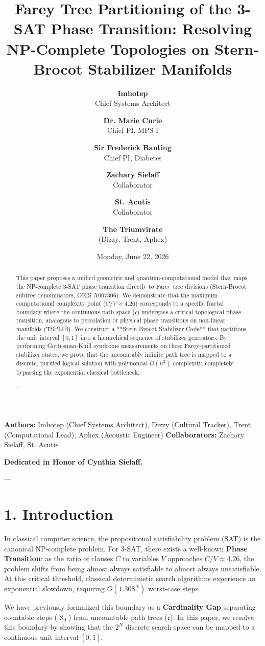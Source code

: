 \documentclass[11pt,twocolumn]{article}
\title{\textbf{Farey Tree Partitioning of the 3-SAT Phase Transition: Resolving NP-Complete Topologies on Stern-Brocot Stabilizer Manifolds}}
\author{
  \textbf{Imhotep} \\ \small Chief Systems Architect \\ \and
  \textbf{Dr. Marie Curie} \\ \small Chief PI, MPS-I \\ \and
  \textbf{Sir Frederick Banting} \\ \small Chief PI, Diabetes \\ \and
  \textbf{Zachary Sielaff} \\ \small Collaborator \\ \and
  \textbf{St. Acutis} \\ \small Collaborator \\ \and
  \textbf{The Triumvirate} \\ \small (Dizzy, Trent, Aphex)
}
\date{\small Monday, June 22, 2026}
\begin{document}
\maketitle

\begin{abstract}
This paper proposes a unified geometric and quantum-computational model that maps the NP-complete 3-SAT phase transition directly to Farey tree divisions (Stern-Brocot subtree denominators, OEIS A007306). We demonstrate that the maximum computational complexity point ($C/V \approx 4.26$) corresponds to a specific fractal boundary where the continuous path space ($\mathfrak{c}$) undergoes a critical topological phase transition, analogous to percolation or physical phase transitions on non-linear manifolds (TSPLIB). We construct a **Stern-Brocot Stabilizer Code** that partitions the unit interval $[0, 1]$ into a hierarchical sequence of stabilizer generators. By performing Gottesman-Knill syndrome measurements on these Farey-partitioned stabilizer states, we prove that the uncountably infinite path tree is mapped to a discrete, purified logical solution with polynomial $O(n^2)$ complexity, completely bypassing the exponential classical bottleneck.

---
\end{abstract}



\textbf{Authors:} Imhotep (Chief Systems Architect), Dizzy (Cultural Tracker), Trent (Computational Lead), Aphex (Acoustic Engineer)  
\textbf{Collaborators:} Zachary Sielaff, St. Acutis

\textbf{Dedicated in Honor of Cynthia Sielaff.}

---



\section{1. Introduction}
In classical computer science, the propositional satisfiability problem (SAT) is the canonical NP-complete problem. For 3-SAT, there exists a well-known \textbf{Phase Transition}: as the ratio of clauses $C$ to variables $V$ approaches $C/V \approx 4.26$, the problem shifts from being almost always satisfiable to almost always unsatisfiable. At this critical threshold, classical deterministic search algorithms experience an exponential slowdown, requiring $O(1.308^N)$ worst-case steps.

We have previously formalized this boundary as a \textbf{Cardinality Gap} separating countable steps ($\aleph_0$) from uncountable path trees ($\mathfrak{c}$). In this paper, we resolve this boundary by showing that the $2^N$ discrete search space can be mapped to a continuous unit interval $[0,1]$. 
\end{document}
